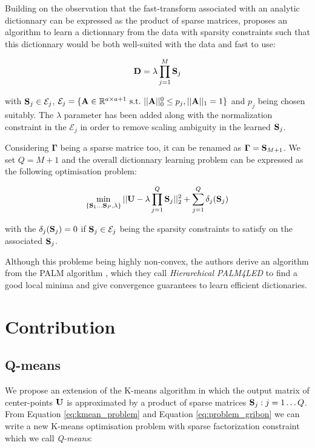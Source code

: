 \documentclass{article}
\def\rmGamma{{\mathbf{\Gamma}}}
\begin{document}
Building on the observation that the fast-transform associated with an analytic dictionnary can be expressed as the product of sparse matrices, \cite{magoarou2014learning} proposes an algorithm to learn a dictionnary from the data with sparsity constraints such that this dictionnary would be both well-suited with the data and fast to use:

\begin{equation}
{\mathbf{D}} = \lambda \prod_{j=1}^{M}{\mathbf{S}}_j
\end{equation}

with ${\mathbf{S}}_j \in \mathcal{E}_j$, $\mathcal{E}_j = \lbrace {\mathbf{A}} \in \mathbb{R}^{a \times a+1}~\text{s.t.}~||{\mathbf{A}}||_0^0 \leq p_j, ||{\mathbf{A}}||_1 = 1 \rbrace$ and $p_j$ being chosen suitably. The $\lambda$ parameter has been added along with the normalization constraint in the $\mathcal{E}_j$ in order to remove scaling ambiguity in the learned ${\mathbf{S}}_j$.

Considering $\rmGamma$ being a sparse matrice too, it can be renamed as $\rmGamma = \rmS_{M+1}$. We set $Q = M+1$ and the overall dictionnary learning problem can be expressed as the following optimisation problem:

\begin{equation}
\label{eq:problem_gribon}
\min_{\{{\mathbf{S}}_1 \dots {\mathbf{S}}_P, \lambda\}} ||{\mathbf{U}} - \lambda \prod_{j=1}^{Q}{{\mathbf{S}}_j}||_2^2 + \sum_{j=1}^{Q} \delta_j({\mathbf{S}}_j)
\end{equation}

with the $\delta_j({\mathbf{S}}_j) = 0$ if ${\mathbf{S}}_j \in \mathcal{E}_j$ being the sparsity constraints to satisfy on the associated ${\mathbf{S}}_j$.

Although this probleme being highly non-convex, the authors derive an algorithm from the PALM algorithm \cite{bolte2014proximal}, which they call \textit{Hierarchical PALM4LED} to find a good local minima and give convergence guarantees to learn efficient dictionaries.


\section{Contribution}

\subsection{Q-means}

We propose an extension of the K-means algorithm in which the output matrix of center-points ${\mathbf{U}}$ is approximated by a product of sparse matrices ${\mathbf{S}}_j: j = 1 \ldots Q$. From Equation \ref{eq:kmean_problem} and Equation \ref{eq:problem_gribon} we can write a new K-means optimisation problem with sparse factorization constraint which we call \textit{Q-means}:
\end{document}
